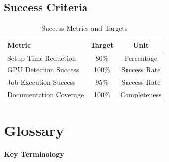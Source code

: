 \documentclass[12pt,a4paper]{report}
\begin{document}
\section{Success Criteria}
\begin{table}[h]
    \centering
    \caption{Success Metrics and Targets}
    \label{tab:success-metrics}
    \begin{tabular}{@{}lcc@{}}
        \toprule
        \textbf{Metric} & \textbf{Target} & \textbf{Unit} \\
        \midrule
        Setup Time Reduction & 80\% & Percentage \\
        GPU Detection Success & 100\% & Success Rate \\
        Job Execution Success & 95\% & Success Rate \\
        Documentation Coverage & 100\% & Completeness \\
        \bottomrule
    \end{tabular}
\end{table}

\chapter{Glossary}
\label{chap:glossary}

\begin{center}
\colorbox{accentcolor}{
    \color{white}\textbf{Key Terminology}
}
\end{center}

\vspace{0.3cm}
\end{document}
